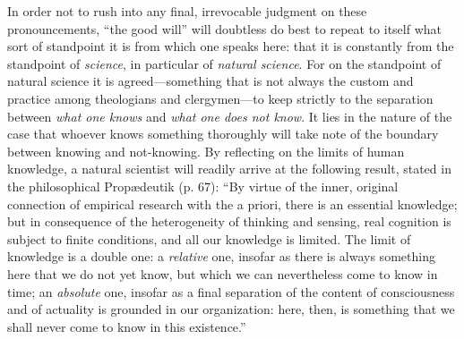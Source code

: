 \documentclass[12pt]{book}
\newcommand{\opage}[1]{\marginnote{\footnotesize\textit{[#1]}}}
\begin{document}
In order not to rush into any final, irrevocable judgment on these pronouncements, ``the good will'' will doubtless do best to repeat to itself what sort of standpoint it is from which one speaks here: that it is constantly from the standpoint of \emph{science}, in particular of \emph{natural science}. For on the standpoint of natural science it is agreed---something that is not always the custom and practice among theologians and clergymen---to keep strictly to the separation between \emph{what one knows} and \emph{what one does not know}. It lies in the nature of the case
\opage{28}\setcounter{footnote}{0}%
that whoever knows something thoroughly will take note of the boundary between knowing and not-knowing. By reflecting on the limits of human knowledge, a natural scientist will readily arrive at the following result, stated in the philosophical Propædeutik (p. 67): ``By virtue of the inner, original connection of empirical research with the a priori, there is an essential knowledge; but in consequence of the heterogeneity of thinking and sensing, real cognition is subject to finite conditions, and all our knowledge is limited. The limit of knowledge is a double one: a \emph{relative} one, insofar as there is always something here that we do not yet know, but which we can nevertheless come to know in time; an \emph{absolute} one, insofar as a final separation of the content of consciousness and of actuality is grounded in our organization: here, then, is something that we shall never come to know in this existence.''
\end{document}

